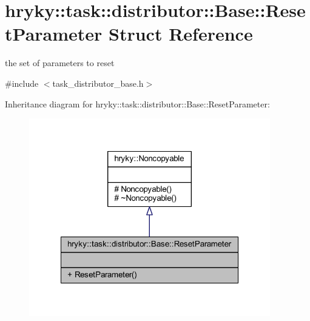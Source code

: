 \hypertarget{structhryky_1_1task_1_1distributor_1_1_base_1_1_reset_parameter}{\section{hryky\-:\-:task\-:\-:distributor\-:\-:Base\-:\-:Reset\-Parameter Struct Reference}
\label{structhryky_1_1task_1_1distributor_1_1_base_1_1_reset_parameter}
}


the set of parameters to reset  




{\ttfamily \#include $<$task\-\_\-distributor\-\_\-base.\-h$>$}



Inheritance diagram for hryky\-:\-:task\-:\-:distributor\-:\-:Base\-:\-:Reset\-Parameter\-:\nopagebreak
\begin{figure}[H]
\begin{center}
\leavevmode
\includegraphics[width=298pt]{structhryky_1_1task_1_1distributor_1_1_base_1_1_reset_parameter__inherit__graph}
\end{center}
\end{figure}
